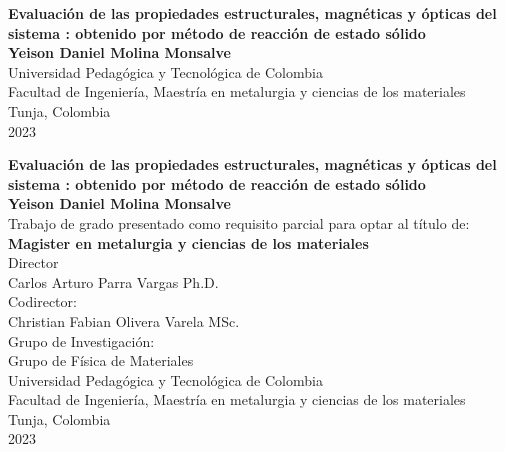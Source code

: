 \begin{center}
    \begin{figure}
        \centering%

    \end{figure}
    \thispagestyle{empty} \vspace*{0.5cm} \textbf{\huge
    Evaluación de las propiedades estructurales, magnéticas y ópticas del
    sistema
    : obtenido por método de
    reacción de
    estado sólido}\\[4cm]
    \Large\textbf{Yeison Daniel Molina Monsalve}\\[4cm]
    \small Universidad Pedagógica y Tecnológica de Colombia\\
    Facultad de Ingeniería, Maestría en metalurgia y ciencias de los
    materiales\\
    Tunja, Colombia\\
    2023\\
\end{center}

\newpage{\pagestyle{empty}}%

\newpage
\begin{center}
    \thispagestyle{empty} \vspace*{0cm} \textbf{\huge
    Evaluación de las propiedades estructurales, magnéticas y ópticas del
    sistema
    : obtenido por método de
    reacción de
    estado sólido}\\[1.1cm]
    \Large\textbf{Yeison Daniel Molina Monsalve}\\[1.1cm]
    \small Trabajo de grado presentado como requisito parcial para
    optar
    al
    título de:\\
    \textbf{Magister en metalurgia y ciencias de los materiales}\\[1.1cm]
    Director\\
    Carlos Arturo Parra Vargas Ph.D.\\[0.5cm]
    Codirector:\\
    Christian Fabian Olivera Varela MSc.\\[1.1cm]
    Grupo de Investigación:\\
    Grupo de Física de Materiales\\[1.1cm]
    Universidad Pedagógica y Tecnológica de Colombia\\
    Facultad de Ingeniería, Maestría en metalurgia y ciencias de los
    materiales\\
    Tunja, Colombia\\
    2023\\
\end{center}


